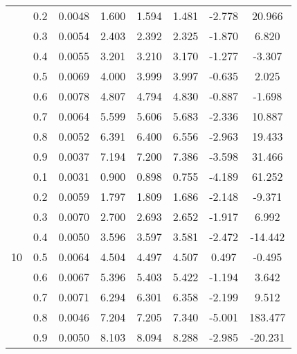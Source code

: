\documentclass[11pt,a4paper]{report}
\begin{document}
\begin{longtable}{ | c | c || c | c | c | c | c | c | }
 & 0.2 & 0.0048 & 1.600 & 1.594 & 1.481 & -2.778 & 20.966 \\
 & 0.3 & 0.0054 & 2.403 & 2.392 & 2.325 & -1.870 & 6.820 \\
 & 0.4 & 0.0055 & 3.201 & 3.210 & 3.170 & -1.277 & -3.307 \\
 & 0.5 & 0.0069 & 4.000 & 3.999 & 3.997 & -0.635 & 2.025 \\
 & 0.6 & 0.0078 & 4.807 & 4.794 & 4.830 & -0.887 & -1.698 \\
 & 0.7 & 0.0064 & 5.599 & 5.606 & 5.683 & -2.336 & 10.887 \\
 & 0.8 & 0.0052 & 6.391 & 6.400 & 6.556 & -2.963 & 19.433 \\
 & 0.9 & 0.0037 & 7.194 & 7.200 & 7.386 & -3.598 & 31.466 \\
 \hline
\multirow{9}{*}{10} & 0.1 & 0.0031 & 0.900 & 0.898 & 0.755 & -4.189 & 61.252 \\
 & 0.2 & 0.0059 & 1.797 & 1.809 & 1.686 & -2.148 & -9.371 \\
 & 0.3 & 0.0070 & 2.700 & 2.693 & 2.652 & -1.917 & 6.992 \\
 & 0.4 & 0.0050 & 3.596 & 3.597 & 3.581 & -2.472 & -14.442 \\
 & 0.5 & 0.0064 & 4.504 & 4.497 & 4.507 & 0.497 & -0.495 \\
 & 0.6 & 0.0067 & 5.396 & 5.403 & 5.422 & -1.194 & 3.642 \\
 & 0.7 & 0.0071 & 6.294 & 6.301 & 6.358 & -2.199 & 9.512 \\
 & 0.8 & 0.0046 & 7.204 & 7.205 & 7.340 & -5.001 & 183.477 \\
 & 0.9 & 0.0050 & 8.103 & 8.094 & 8.288 & -2.985 & -20.231 \\
 \hline
\hline
\end{longtable}
\end{document}
